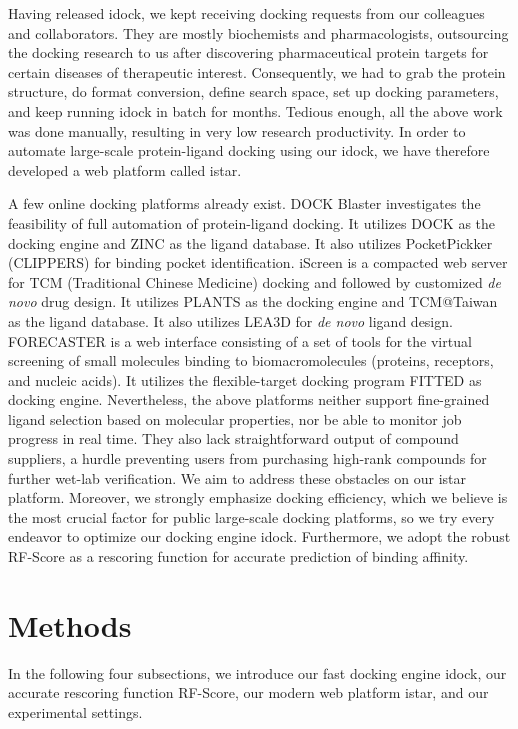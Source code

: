 \documentclass[10pt]{article}
\begin{document}
Having released idock, we kept receiving docking requests from our colleagues and collaborators. They are mostly biochemists and pharmacologists, outsourcing the docking research to us after discovering pharmaceutical protein targets for certain diseases of therapeutic interest. Consequently, we had to grab the protein structure, do format conversion, define search space, set up docking parameters, and keep running idock in batch for months. Tedious enough, all the above work was done manually, resulting in very low research productivity. In order to automate large-scale protein-ligand docking using our idock, we have therefore developed a web platform called istar.

A few online docking platforms already exist. DOCK Blaster \cite{557} investigates the feasibility of full automation of protein-ligand docking. It utilizes DOCK \cite{1222} as the docking engine and ZINC \cite{532,1178} as the ligand database. It also utilizes PocketPickker (CLIPPERS) \cite{395} for binding pocket identification. iScreen \cite{899} is a compacted web server for TCM (Traditional Chinese Medicine) docking and followed by customized \textit{de novo} drug design. It utilizes PLANTS \cite{610,607,779} as the docking engine and TCM@Taiwan \cite{528} as the ligand database. It also utilizes LEA3D \cite{1223} for \textit{de novo} ligand design. FORECASTER \cite{1012} is a web interface consisting of a set of tools for the virtual screening of small molecules binding to biomacromolecules (proteins, receptors, and nucleic acids). It utilizes the flexible-target docking program FITTED \cite{602} as docking engine. Nevertheless, the above platforms neither support fine-grained ligand selection based on molecular properties, nor be able to monitor job progress in real time. They also lack straightforward output of compound suppliers, a hurdle preventing users from purchasing high-rank compounds for further wet-lab verification. We aim to address these obstacles on our istar platform. Moreover, we strongly emphasize docking efficiency, which we believe is the most crucial factor for public large-scale docking platforms, so we try every endeavor to optimize our docking engine idock. Furthermore, we adopt the robust RF-Score \cite{564} as a rescoring function for accurate prediction of binding affinity.

\section*{Methods}
In the following four subsections, we introduce our fast docking engine idock, our accurate rescoring function RF-Score, our modern web platform istar, and our experimental settings.
\end{document}
